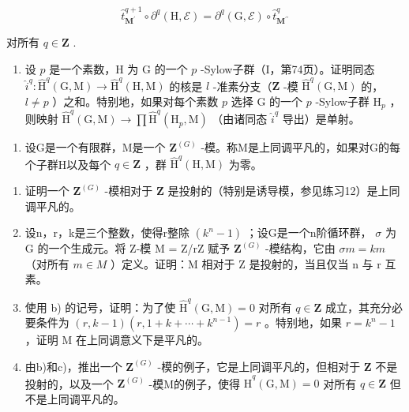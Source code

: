 \[
\hat {t} _ {\mathbf {M} ^ {\prime}} ^ {q + 1} \circ \partial^ {q} (\mathrm{H}, \mathcal {E}) = \partial^ {q} (\mathrm{G}, \mathcal {E}) \circ \hat {t} _ {\mathbf {M} ^ {\prime \prime}} ^ {q}
\]

对所有 \(q \in \mathbf{Z}\) .

\begin{enumerate}
\def\labelenumi{\alph{enumi})}
\setcounter{enumi}{4}
\tightlist
\item
  设 \(p\) 是一个素数，H 为 G 的一个 \(p\) -Sylow子群（I，第74页）。证明同态 \(\hat{i}^q: \hat{\mathrm{H}}^q(\mathrm{G}, \mathrm{M}) \to \hat{\mathrm{H}}^q(\mathrm{H}, \mathrm{M})\) 的核是 \(l\) -准素分支（\(\mathbf{Z}\) -模 \(\hat{\mathrm{H}}^q(\mathrm{G}, \mathrm{M})\) 的， \(l \neq p\) ）之和。特别地，如果对每个素数 \(p\) 选择 G 的一个 \(p\) -Sylow子群 \(\mathrm{H}_p\) ，则映射 \(\hat{\mathrm{H}}^q(\mathrm{G}, \mathrm{M}) \to \prod \hat{\mathrm{H}}^q(\mathrm{H}_p, \mathrm{M})\) （由诸同态 \(\hat{i}^q\) 导出）是单射。
\end{enumerate}

\begin{enumerate}
\def\labelenumi{\arabic{enumi})}
\setcounter{enumi}{17}
\tightlist
\item
  设G是一个有限群，M是一个 \(\mathbf{Z}^{(G)}\) -模。称M是上同调平凡的，如果对G的每个子群H以及每个 \(q \in \mathbf{Z}\) ，群 \(\hat{\mathrm{H}}^q(\mathrm{H}, \mathrm{M})\) 为零。
\end{enumerate}

\begin{enumerate}
\def\labelenumi{\alph{enumi})}
\item
  证明一个 \(\mathbf{Z}^{(G)}\) -模相对于 \(\mathbf{Z}\) 是投射的（特别是诱导模，参见练习12）是上同调平凡的。
\item
  设n，r，k是三个整数，使得r整除 \((k^{n} - 1)\) ；设G是一个n阶循环群， \(\sigma\) 为 G 的一个生成元。将 Z-模 M = Z/rZ 赋予 \(\mathbf{Z}^{(G)}\) -模结构，它由 \(\sigma m = km\) （对所有 \(m \in M\) ）定义。证明：M 相对于 Z 是投射的，当且仅当 n 与 r 互素。
\item
  使用 b) 的记号，证明：为了使 \(\hat{\mathrm{H}}^{q}(\mathrm{G}, \mathrm{M}) = 0\) 对所有 \(q \in \mathbf{Z}\) 成立，其充分必要条件为 \((r, k - 1)(r, 1 + k + \cdots + k^{n-1}) = r\) 。特别地，如果 \(r = k^{n} - 1\) ，证明 M 在上同调意义下是平凡的。
\item
  由b)和c)，推出一个 \(\mathbf{Z}^{(G)}\) -模的例子，它是上同调平凡的，但相对于 \(\mathbf{Z}\) 不是投射的，以及一个 \(\mathbf{Z}^{(G)}\) -模M的例子，使得 \(\hat{\mathrm{H}}^q (\mathrm{G},\mathrm{M}) = 0\) 对所有 \(q\in \mathbf{Z}\) 但不是上同调平凡的。
\end{enumerate}

